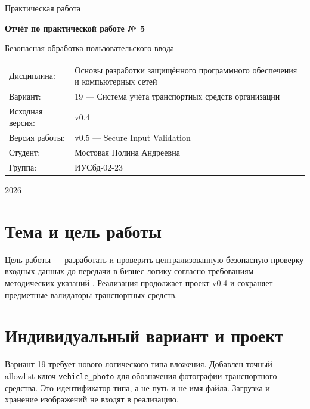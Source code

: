 \documentclass[12pt,a4paper]{article}
\begin{document}
\begin{titlepage}
\centering
{\large Практическая работа\par}
\vspace{2.5cm}
{\LARGE\bfseries Отчёт по практической работе № 5\par}
\vspace{0.6cm}
{\Large Безопасная обработка пользовательского ввода\par}
\vspace{1.8cm}
\begin{tabular}{p{4cm}p{11cm}}
Дисциплина: & Основы разработки защищённого программного обеспечения и компьютерных сетей\\
Вариант: & 19 — Система учёта транспортных средств организации\\
Исходная версия: & v0.4\\
Версия работы: & v0.5 — Secure Input Validation\\
Студент: & Мостовая Полина Андреевна\\
Группа: & ИУСбд-02-23
\end{tabular}
\vfill
{\large 2026\par}
\end{titlepage}
\tableofcontents
\clearpage
\section{Тема и цель работы}
Цель работы — разработать и проверить централизованную безопасную проверку входных данных до передачи в бизнес-логику согласно требованиям методических указаний \cite{method5}. Реализация продолжает проект v0.4 и сохраняет предметные валидаторы транспортных средств.

\section{Индивидуальный вариант и проект}
Вариант 19 требует нового логического типа вложения. Добавлен точный allowlist-ключ \texttt{vehicle\_photo} для обозначения фотографии транспортного средства. Это идентификатор типа, а не путь и не имя файла. Загрузка и хранение изображений не входят в реализацию.
\end{document}
